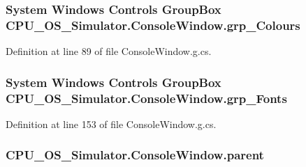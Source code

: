 \subsubsection[{grp\+\_\+\+Colours}]{\setlength{\rightskip}{0pt plus 5cm}System Windows Controls Group\+Box C\+P\+U\+\_\+\+O\+S\+\_\+\+Simulator.\+Console\+Window.\+grp\+\_\+\+Colours\hspace{0.3cm}{\ttfamily [package]}}\label{class_c_p_u___o_s___simulator_1_1_console_window_aefc749577a14756234b1a73c0a4a6f50}


Definition at line 89 of file Console\+Window.\+g.\+cs.

\hypertarget{class_c_p_u___o_s___simulator_1_1_console_window_a2d8d6d1f3ee210b44e0eabd3c063438d}{}
\subsubsection[{grp\+\_\+\+Fonts}]{\setlength{\rightskip}{0pt plus 5cm}System Windows Controls Group\+Box C\+P\+U\+\_\+\+O\+S\+\_\+\+Simulator.\+Console\+Window.\+grp\+\_\+\+Fonts\hspace{0.3cm}{\ttfamily [package]}}\label{class_c_p_u___o_s___simulator_1_1_console_window_a2d8d6d1f3ee210b44e0eabd3c063438d}


Definition at line 153 of file Console\+Window.\+g.\+cs.

\hypertarget{class_c_p_u___o_s___simulator_1_1_console_window_a1e38326bb40f4ed44c4964d94dc6f809}{}
\subsubsection[{parent}]{ C\+P\+U\+\_\+\+O\+S\+\_\+\+Simulator.\+Console\+Window.\+parent\hspace{0.3cm}{\ttfamily [private]}}\label{class_c_p_u___o_s___simulator_1_1_console_window_a1e38326bb40f4ed44c4964d94dc6f809}


